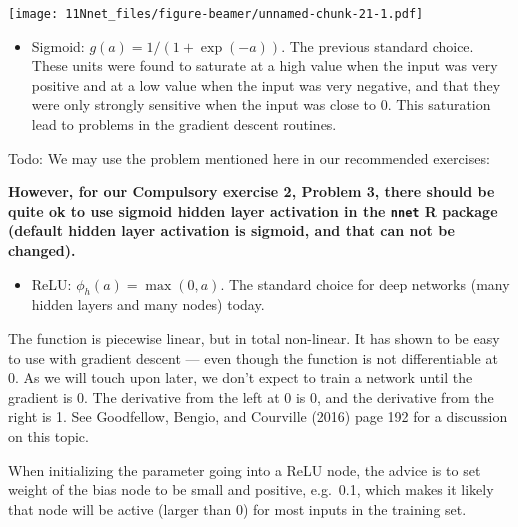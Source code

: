 \documentclass[10pt,ignorenonframetext,]{beamer}
\providecommand{\tightlist}{%
  \setlength{\itemsep}{0pt}\setlength{\parskip}{0pt}}
\begin{document}
\begin{frame}

\scriptsize

\texttt{[image: 11Nnet\_files/figure-beamer/unnamed-chunk-21-1.pdf]}

\end{frame}

\begin{frame}[fragile]

\begin{itemize}
\tightlist
\item
  Sigmoid: \(g(a)=1/(1+\exp(-a))\). The previous standard choice. These
  units were found to saturate at a high value when the input was very
  positive and at a low value when the input was very negative, and that
  they were only strongly sensitive when the input was close to 0. This
  saturation lead to problems in the gradient descent routines.
\end{itemize}

Todo: We may use the problem mentioned here in our recommended
exercises:

\textbf{However, for our Compulsory exercise 2, Problem 3, there should
be quite ok to use sigmoid hidden layer activation in the \texttt{nnet}
R package (default hidden layer activation is sigmoid, and that can not
be changed).}

\end{frame}

\begin{frame}

\begin{itemize}
\tightlist
\item
  ReLU: \(\phi_h(a)=\max(0,a)\). The standard choice for deep networks
  (many hidden layers and many nodes) today.
\end{itemize}

The function is piecewise linear, but in total non-linear. It has shown
to be easy to use with gradient descent --- even though the function is
not differentiable at 0. As we will touch upon later, we don't expect to
train a network until the gradient is 0. The derivative from the left at
0 is 0, and the derivative from the right is 1. See Goodfellow, Bengio,
and Courville (2016) page 192 for a discussion on this topic.

When initializing the parameter going into a ReLU node, the advice is to
set weight of the bias node to be small and positive, e.g.~0.1, which
makes it likely that node will be active (larger than 0) for most inputs
in the training set.

\end{frame}
\end{document}
